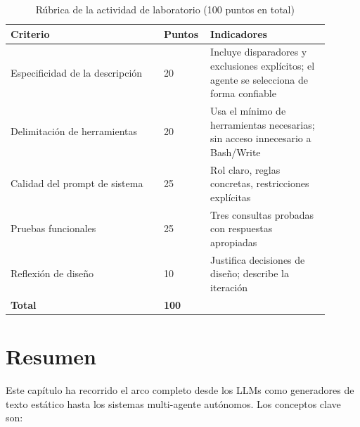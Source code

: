 \documentclass[11pt,letterpaper]{article}
\begin{document}
\begin{table}[H]
\centering
\caption{Rúbrica de la actividad de laboratorio (100 puntos en total)}
\begin{tabular}{@{}p{0.45\linewidth}p{0.1\linewidth}p{0.35\linewidth}@{}}
\toprule
\textbf{Criterio} & \textbf{Puntos} & \textbf{Indicadores} \\
\midrule
Especificidad de la descripción & 20 & Incluye disparadores y exclusiones explícitos; el agente se selecciona de forma confiable \\
Delimitación de herramientas & 20 & Usa el mínimo de herramientas necesarias; sin acceso innecesario a Bash/Write \\
Calidad del prompt de sistema & 25 & Rol claro, reglas concretas, restricciones explícitas \\
Pruebas funcionales & 25 & Tres consultas probadas con respuestas apropiadas \\
Reflexión de diseño & 10 & Justifica decisiones de diseño; describe la iteración \\
\midrule
\textbf{Total} & \textbf{100} & \\
\bottomrule
\end{tabular}
\end{table}

\section{Resumen}

Este capítulo ha recorrido el arco completo desde los LLMs como generadores de texto estático hasta los sistemas multi-agente autónomos. Los conceptos clave son:
\end{document}
